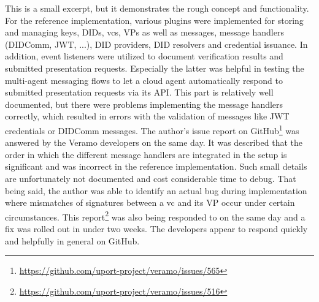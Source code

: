    This is a small excerpt, but it demonstrates the rough concept and functionality. For the reference implementation, various plugins were implemented for storing and managing keys, \acp{DID}, \acp{vc}, \acp{VP} as well as messages, message handlers (DIDComm, JWT, ...), \ac{DID} providers, \ac{DID} resolvers and credential issuance. In addition, event listeners were utilized to document verification results and submitted presentation requests. Especially the latter was helpful in testing the multi-agent messaging flows to let a cloud agent automatically respond to submitted presentation requests via its API. This part is relatively well documented, but there were problems implementing the message handlers correctly, which resulted in errors with the validation of messages like JWT credentials or DIDComm messages. The author's issue report on GitHub\footnote{\href{https://github.com/uport-project/veramo/issues/565}{https://github.com/uport-project/veramo/issues/565}} was answered by the Veramo developers on the same day. It was described that the order in which the different message handlers are integrated in the setup is significant and was incorrect in the reference implementation. Such small details are unfortunately not documented and cost considerable time to debug. That being said, the author was able to identify an actual bug during implementation where mismatches of signatures between a \ac{vc} and its \ac{VP} occur under certain circumstances. This report\footnote{\href{https://github.com/uport-project/veramo/issues/516}{https://github.com/uport-project/veramo/issues/516}} was also being responded to on the same day and a fix was rolled out in under two weeks. The developers appear to respond quickly and helpfully in general on GitHub.
    
